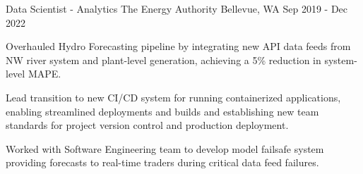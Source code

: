 \begin{cventries}

    \cventry
    {Data Scientist - Analytics} %
    {The Energy Authority} %
    {Bellevue, WA} %
    {Sep 2019 - Dec 2022} %
    {
      \begin{cvitems} %
        \item {Overhauled Hydro Forecasting pipeline by integrating new API data feeds from NW river system and plant-level generation, achieving a 5\% reduction in system-level MAPE.}
        \item {Lead transition to new CI/CD system for running containerized applications, enabling streamlined deployments and builds and establishing new team standards for project version control and production deployment.}
        \item {Worked with Software Engineering team to develop model failsafe system providing forecasts to real-time traders during critical data feed failures.}
      \end{cvitems}
    }


\end{cventries}
